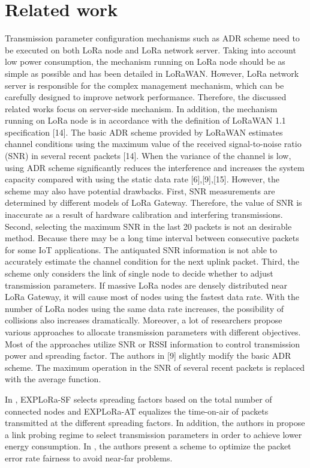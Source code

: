 \section{Related work} \label{sec:Related work}


Transmission parameter configuration mechanisms such as ADR scheme need to be executed on both LoRa node and LoRa network server.
Taking into account low power consumption,
	the mechanism running on LoRa node should be as simple as possible and has been detailed in LoRaWAN.
However,
	LoRa network server is responsible for the complex management mechanism,
	which can be carefully designed to improve network performance.
Therefore,
	the discussed related works focus on server-side mechanism.
In addition,
	the mechanism running on LoRa node is in accordance with the definition of LoRaWAN 1.1 specification [14].
The basic ADR scheme provided by LoRaWAN estimates channel conditions using the maximum value of the received signal-to-noise ratio (SNR) in several recent packets [14].
When the variance of the channel is low,
	using ADR scheme significantly reduces the interference and increases the system capacity compared with using the static data rate [6],[9],[15].
However,
	the scheme may also have potential drawbacks.
First,
	SNR measurements are determined by different models of LoRa Gateway.
Therefore,
	the value of SNR is inaccurate as a result of hardware calibration and interfering transmissions.
Second,
	selecting the maximum SNR in the last 20 packets is not an desirable method.
Because there may be a long time interval between consecutive packets for some IoT applications.
The antiquated SNR information is not able to accurately estimate the channel condition for the next uplink packet.
Third,
	the scheme only considers the link of single node to decide whether to adjust transmission parameters.
If massive LoRa nodes are densely distributed near LoRa Gateway,
	it will cause most of nodes using the fastest data rate.
With the number of LoRa nodes using the same data rate increases,
	the possibility of collisions also increases dramatically.
Moreover,
	a lot of researchers propose various approaches to allocate transmission parameters with different objectives.
Most of the approaches utilize SNR or RSSI information to control transmission power and spreading factor.
The authors in [9] slightly modify the basic ADR scheme.
The maximum operation in the SNR of several recent packets is replaced with the average function.

In \cite{cuomo_explora_2017},
	EXPLoRa-SF selects spreading factors based on the total number of connected nodes and EXPLoRa-AT equalizes the time-on-air of packets transmitted at the different spreading factors.
In addition,
	the authors in \cite{bor_lora_2017} propose a link probing regime to select transmission parameters in order to achieve lower energy consumption.
In \cite{reynders_power_2017},
	the authors present a scheme to optimize the packet error rate fairness to avoid near-far problems.





